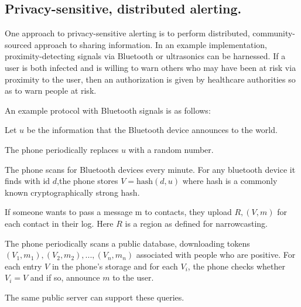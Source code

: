 \documentclass{article}
\begin{document}
\subsection{Privacy-sensitive, distributed alerting.} 
One approach to privacy-sensitive alerting is to perform distributed, community-sourced approach to sharing information. In an example implementation, proximity-detecting signals via Bluetooth or ultrasonics can be harnessed.  If a user is both infected and is willing to warn others who may have been at risk via proximity to the user, then an authorization is given by healthcare authorities so as to warn people at risk.

An example protocol with Bluetooth signals is as follows:

Let $u$ be the information that the Bluetooth device announces to the world.

The phone periodically replaces $u$ with a random number.

The phone scans for Bluetooth devices every minute.  For any bluetooth device it finds with id $d$,the phone stores $V = \mbox{hash}(d,u)$ where hash is a commonly known cryptographically strong hash.

If someone wants to pass a message m to contacts, they upload $R,(V,m)$ for each contact in their log.  Here $R$ is a region as defined for narrowcasting.

The phone periodically scans a public database, downloading tokens $(V_1,m_1), (V_2,m_2),..., (V_n, m_n)$ associated with people who are positive.  For each entry $V$ in the phone’s storage and for each $V_i$, the phone checks whether $V_i=V$ and if so, announce $m$ to the user.

The same public server can support these queries. 
\end{document}
